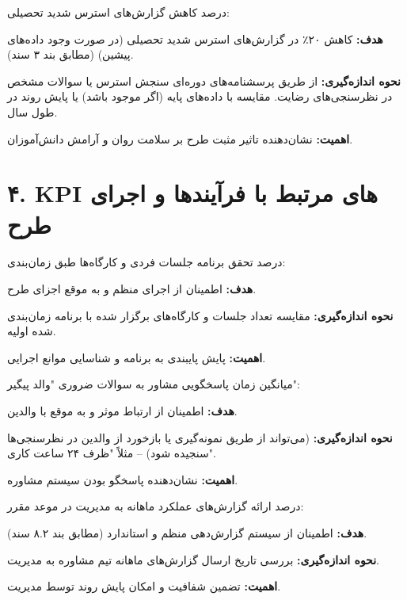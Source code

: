 \documentclass[12pt,a4paper]{article}
\newcommand{\kpiitem}[1]{\par\textbf{#1}}
\begin{document}
\vspace{1em}
 درصد کاهش گزارش‌های استرس شدید تحصیلی:
\kpiitem{هدف:} کاهش ۲۰٪ در گزارش‌های استرس شدید تحصیلی (در صورت وجود داده‌های پیشین) (مطابق بند ۳ سند).
\kpiitem{نحوه اندازه‌گیری:} از طریق پرسشنامه‌های دوره‌ای سنجش استرس یا سوالات مشخص در نظرسنجی‌های رضایت. مقایسه با داده‌های پایه (اگر موجود باشد) یا پایش روند در طول سال.
\kpiitem{اهمیت:} نشان‌دهنده تاثیر مثبت طرح بر سلامت روان و آرامش دانش‌آموزان.

\vspace{1em}
\hrulefill
\vspace{1em}

\section*{۴. KPI های مرتبط با فرآیندها و اجرای طرح}

 درصد تحقق برنامه جلسات فردی و کارگاه‌ها طبق زمان‌بندی:
\kpiitem{هدف:} اطمینان از اجرای منظم و به موقع اجزای طرح.
\kpiitem{نحوه اندازه‌گیری:} مقایسه تعداد جلسات و کارگاه‌های برگزار شده با برنامه زمان‌بندی شده اولیه.
\kpiitem{اهمیت:} پایش پایبندی به برنامه و شناسایی موانع اجرایی.

\vspace{1em}
 میانگین زمان پاسخگویی مشاور به سوالات ضروری "والد پیگیر":
\kpiitem{هدف:} اطمینان از ارتباط موثر و به موقع با والدین.
\kpiitem{نحوه اندازه‌گیری:} (می‌تواند از طریق نمونه‌گیری یا بازخورد از والدین در نظرسنجی‌ها سنجیده شود) – مثلاً "ظرف ۲۴ ساعت کاری".
\kpiitem{اهمیت:} نشان‌دهنده پاسخگو بودن سیستم مشاوره.

\vspace{1em}
 درصد ارائه گزارش‌های عملکرد ماهانه به مدیریت در موعد مقرر:
\kpiitem{هدف:} اطمینان از سیستم گزارش‌دهی منظم و استاندارد (مطابق بند ۸.۲ سند).
\kpiitem{نحوه اندازه‌گیری:} بررسی تاریخ ارسال گزارش‌های ماهانه تیم مشاوره به مدیریت.
\kpiitem{اهمیت:} تضمین شفافیت و امکان پایش روند توسط مدیریت.

\vspace{1em}
\hrulefill
\vspace{1em}
\hrulefill
\vspace{1em}
\end{document}
